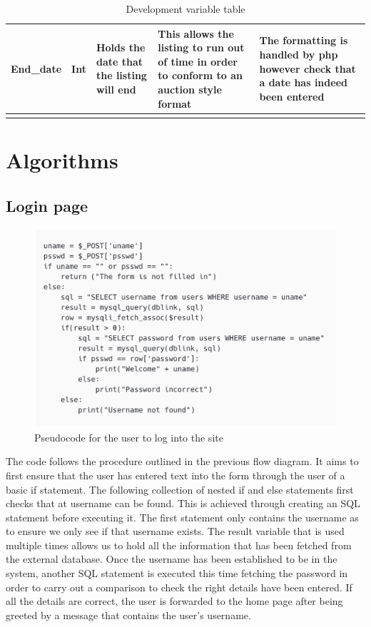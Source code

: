 \begin{center}
\begin{longtable}{|P{1.7cm}|P{1cm}|P{3.5cm}|P{3cm}|P{3cm}|}
        End\_date & Int & Holds the date that the listing will end & This allows the listing to run out of time in order to conform to an auction style format & The formatting is handled by php however check that a date has indeed been entered \\ \hline
    \caption{Development variable table}
\label{tab:develop_var}
\end{longtable}
\end{center}

\section{Algorithms \parencite{carbon_app}}
\subsection{Login page}
\begin{figure}[H]
    \centering
    \includegraphics[scale=0.4]{ch2_design/alg_login.png}
    \caption{Pseudocode for the user to log into the site}
    \label{fig:alg_login}
\end{figure}
The code follows the procedure outlined in the previous flow diagram. It aims to first ensure that the user has entered text into the form through the user of a basic if statement. The following collection of nested if and else statements first checks that at username can be found. This is achieved through creating an SQL statement before executing it. The first statement only contains the username as to ensure we only see if that username exists. The result variable that is used multiple times allows us to hold all the information that has been fetched from the external database. Once the username has been established to be in the system, another SQL statement is executed this time fetching the password in order to carry out a comparison to check the right details have been entered. If all the details are correct, the user is forwarded to the home page after being greeted by a message that contains the user’s username.

